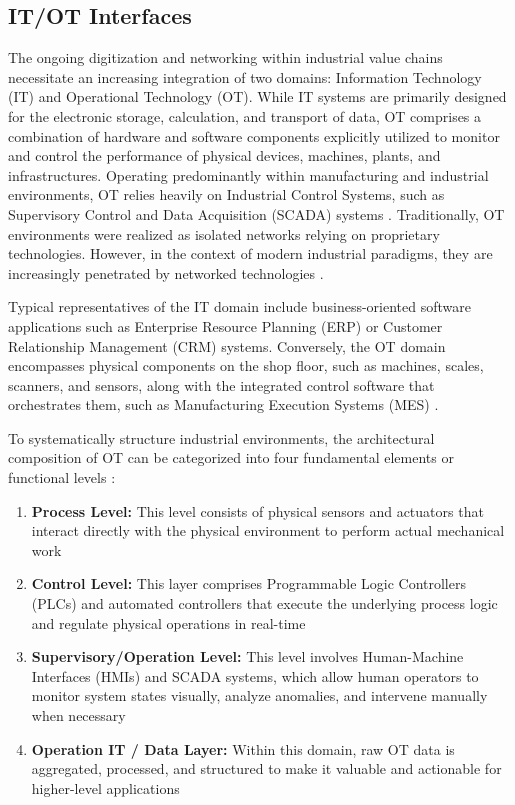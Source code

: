 \subsection{IT/OT Interfaces} 
\label{subsec:it_ot_interfaces} 

The ongoing digitization and networking within industrial value chains necessitate an increasing integration of two domains: Information Technology (IT) and Operational Technology (OT). While IT systems are primarily designed for the electronic storage, calculation, and transport of data, OT comprises a combination of hardware and software components explicitly utilized to monitor and control the performance of physical devices, machines, plants, and infrastructures. Operating predominantly within manufacturing and industrial environments, OT relies heavily on Industrial Control Systems, such as Supervisory Control and Data Acquisition (SCADA) systems \cite[p. 1]{8586807}. Traditionally, OT environments were realized as isolated networks relying on proprietary technologies. However, in the context of modern industrial paradigms, they are increasingly penetrated by networked technologies \cite[p. 1]{8586807}.

Typical representatives of the IT domain include business-oriented software applications such as Enterprise Resource Planning (ERP) or Customer Relationship Management (CRM) systems. Conversely, the OT domain encompasses physical components on the shop floor, such as machines, scales, scanners, and sensors, along with the integrated control software that orchestrates them, such as Manufacturing Execution Systems (MES) \cite[p. 404]{10.1007/978-3-030-85969-5_37}.

To systematically structure industrial environments, the architectural composition of OT can be categorized into four fundamental elements or functional levels \cite{hwi_ot_definition}:
\begin{enumerate}
	\item \textbf{Process Level:} This level consists of physical sensors and actuators that interact directly with the physical environment to perform actual mechanical work
	\item \textbf{Control Level:} This layer comprises Programmable Logic Controllers (PLCs) and automated controllers that execute the underlying process logic and regulate physical operations in real-time
	\item \textbf{Supervisory/Operation Level:} This level involves Human-Machine Interfaces (HMIs) and SCADA systems, which allow human operators to monitor system states visually, analyze anomalies, and intervene manually when necessary
	\item \textbf{Operation IT / Data Layer:} Within this domain, raw OT data is aggregated, processed, and structured to make it valuable and actionable for higher-level applications
\end{enumerate}

